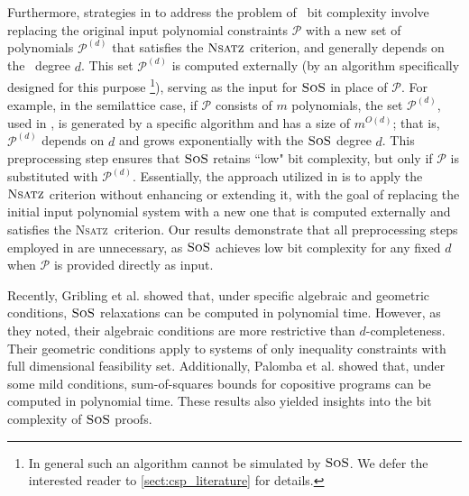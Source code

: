 \documentclass[11pt]{article}
\newcommand{\sos}{\text{\sc{SoS}}}
\newcommand{\Nsatz}{\textsc{Nsatz}}
\newcommand{\1}{\textbf{1}}
\begin{document}
Furthermore, strategies in \cite{BharathiM21,BulatovRSTOC22,BulatovARXIV21, Mastrolilli21TALG} to address the problem of \sos\ bit complexity involve replacing the original input polynomial constraints \(\mathcal{P}\) with a new set of polynomials $\mathcal{P}^{(d)}$ that satisfies the \(\Nsatz\) criterion, and generally depends on the \sos\ degree \(d\). This set $\mathcal{P}^{(d)}$ is computed externally (by an algorithm specifically designed for this purpose \footnote{In general such an algorithm cannot be simulated by $\sos$. We defer the interested reader to \cref{sect:csp_literature} for details.}), serving as the input for \(\sos\) in place of $\mathcal{P}$. For example, in the semilattice case, if $\mathcal{P}$ consists of $m$ polynomials, the set $\mathcal{P}^{(d)}$, used in \cite{BulatovRSTOC22,Mastrolilli21TALG}, is generated by a specific algorithm and has a size of \( m^{O(d)} \); that is, $\mathcal{P}^{(d)}$ depends on \( d \) and grows exponentially with the \(\sos\) degree \( d \). This preprocessing step ensures that \(\sos\) retains ``low" bit complexity, but only if $\mathcal{P}$ is substituted with $\mathcal{P}^{(d)}$. Essentially, the approach utilized in \cite{BharathiM21,BulatovRSTOC22,BulatovARXIV21, Mastrolilli21TALG} is to apply the \(\Nsatz\) criterion without enhancing or extending it, with the goal of replacing the initial input polynomial system with a new one that is computed externally and satisfies the \Nsatz\ criterion.
Our results demonstrate that all preprocessing steps employed in \cite{BharathiM21,BulatovRSTOC22,Mastrolilli21TALG} are unnecessary, as \(\sos\) achieves low bit complexity for any fixed \( d \) when \(\mathcal{P}\) is provided directly as input.

Recently, Gribling et al. \cite{Gribling23} showed that, under specific algebraic and geometric conditions, $\sos$ relaxations can be computed in polynomial time. However, as they noted, their algebraic conditions are more restrictive than $d$-completeness. Their geometric conditions apply to systems of only inequality constraints with full dimensional feasibility set.  Additionally, Palomba et al. \cite{palomba} showed that, under some mild conditions, sum-of-squares bounds for copositive programs can be computed in polynomial time. These results also yielded insights into the bit complexity of $\sos$ proofs.
\end{document}
